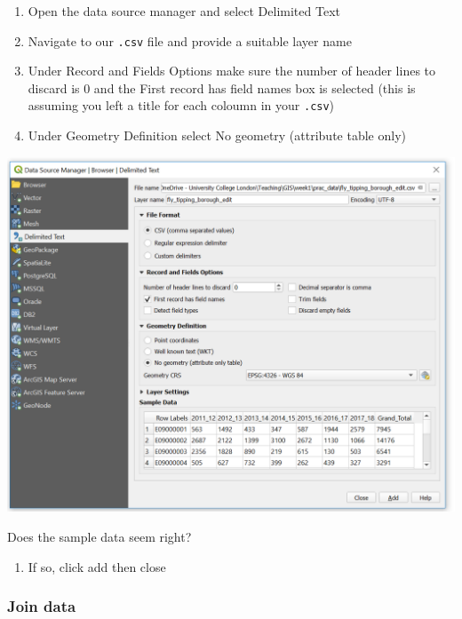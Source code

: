 \documentclass[]{book}
\providecommand{\tightlist}{%
  \setlength{\itemsep}{0pt}\setlength{\parskip}{0pt}}
\begin{document}
\begin{enumerate}
\def\labelenumi{\arabic{enumi}.}
\setcounter{enumi}{3}
\tightlist
\item
  Open the data source manager and select Delimited Text
\item
  Navigate to our \texttt{.csv} file and provide a suitable layer name
\item
  Under Record and Fields Options make sure the number of header lines to discard is 0 and the First record has field names box is selected (this is assuming you left a title for each coloumn in your \texttt{.csv})
\item
  Under Geometry Definition select No geometry (attribute table only)
\end{enumerate}

\begin{center}\includegraphics[width=700pt]{prac1_images/csv_datamanager} \end{center}

Does the sample data seem right?

\begin{enumerate}
\def\labelenumi{\arabic{enumi}.}
\setcounter{enumi}{7}
\tightlist
\item
  If so, click add then close
\end{enumerate}

\hypertarget{join-data-1}{%
\subsubsection{Join data}\label{join-data-1}}
\end{document}
